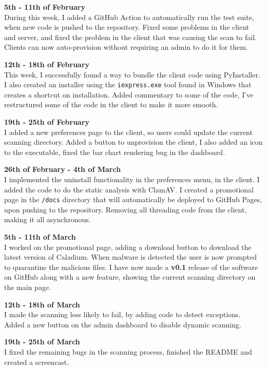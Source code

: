 \textbf{5th - 11th of February} \\
During this week, I added a GitHub Action to automatically run the test suite,
when new code is pushed to the repository.
Fixed some problems in the client and server,
and fixed the problem in the client that was causing the scan to fail.
Clients can now auto-provision without requiring an admin to do it for them.

\textbf{12th - 18th of February} \\
This week, I successfully found a way to bundle the client code using PyInstaller.
I also created an installer using the \texttt{iexpress.exe} tool found in Windows
that creates a shortcut on installation.
Added commentary to some of the code,
I've restructured some of the code in the client to make it more smooth.

\textbf{19th - 25th of February} \\
I added a new preferences page to the client,
so users could update the current scanning directory.
Added a button to unprovision the client, I also added an icon to the executable,
fixed the bar chart rendering bug in the dashboard.

\textbf{26th of February - 4th of March} \\
I implemented the uninstall functionality in the preferences menu, in the client.
I added the code to do the static analysis with ClamAV.
I created a promotional page in the \texttt{/docs} directory
that will automatically be deployed to GitHub Pages, upon pushing to the repository.
Removing all threading code from the client, making it all asynchronous.

\textbf{5th - 11th of March} \\
I worked on the promotional page, adding a download button to
download the latest version of Caladium.
When malware is detected the user is now
prompted to quarantine the malicious files.
I have now made a \textbf{v0.1} release of the software on GitHub
along with a new feature, showing the current scanning directory on the main page.

\textbf{12th - 18th of March} \\
I made the scanning less likely to fail, by adding code to detect exceptions.
Added a new button on the admin dashboard to disable dynamic scanning.

\textbf{19th - 25th of March} \\
I fixed the remaining bugs in the scanning process,
finished the README and created a screencast.

